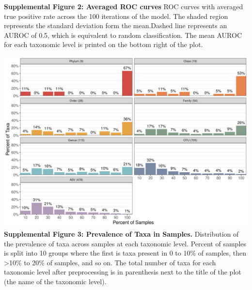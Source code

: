 \documentclass[
]{article}
\begin{document}
\textbf{Supplemental Figure 2: Averaged ROC curves} ROC curves with
averaged true positive rate across the 100 iterations of the model. The
shaded region represents the standard deviation form the mean.Dashed
line represents an AUROC of 0.5, which is equivalent to random
classification. The mean AUROC for each taxonomic level is printed on
the bottom right of the plot.

\newpage

\includegraphics[width=\textwidth,height=0.45\textheight]{figure_s3.png}\\
\textbf{Supplemental Figure 3: Prevalence of Taxa in Samples.}
Distribution of the prevalence of taxa across samples at each taxonomic
level. Percent of samples is split into 10 groups where the first is
taxa present in 0 to 10\% of samples, then \textgreater10\% to 20\% of
samples, and so on. The total number of taxa for each taxonomic level
after preprocessing is in parenthesis next to the title of the plot (the
name of the taxonomic level).

\newpage
\end{document}

